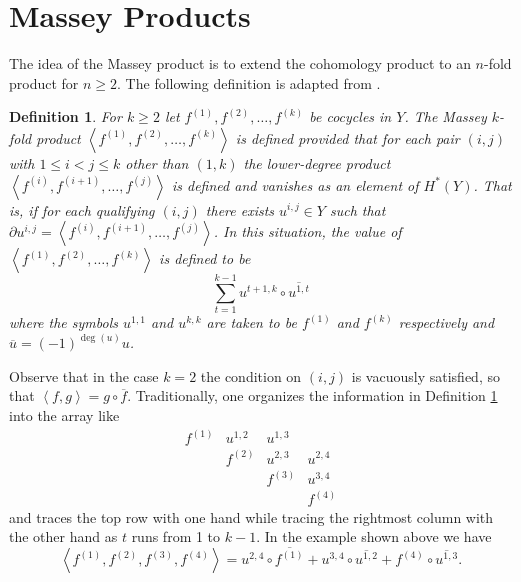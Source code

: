 \documentclass[12pt]{article}
\newtheorem{definition}{Definition}
\begin{document}
\section{Massey Products}\label{mp}
The idea of the Massey product is to extend the cohomology
product to an $n$-fold product for $n\ge 2$.
The following definition is adapted from \cite{kraines}.

\begin{definition}\label{massey}
For $k\ge 2$ let 
$f^{\left(1\right)},
f^{\left(2\right)},\dots,f^{\left(k\right)}$ be cocycles in $Y$.
The {\em Massey $k$-fold product} 
$\left\langle f^{\left(1\right)},
f^{\left(2\right)},\dots,f^{\left(k\right)}\right\rangle$
is defined provided that for each pair $\left(i,j\right)$
with $1\le i<j\le k$ other than $\left(1,k\right)$
the lower-degree product 
$\left\langle f^{\left(i\right)},
f^{\left(i+1\right)},\dots,f^{\left(j\right)}\right\rangle$
is defined and vanishes as an element of $H^\ast\left(Y\right)$.
That is, if for each qualifying $\left(i,j\right)$
there exists $u^{i,j}\in Y$ such that 
$\partial u^{i,j}
=\left\langle f^{\left(i\right)},
f^{\left(i+1\right)},\dots,f^{\left(j\right)}\right\rangle$.
In this situation, the value of
$\left\langle f^{\left(1\right)},
f^{\left(2\right)},\dots,f^{\left(k\right)}\right\rangle$
is defined to be
\[\sum_{t=1}^{k-1}
u^{t+1,k}\circ
\overline{u^{1,t}}
\]
where the symbols $u^{1,1}$ and $u^{k,k}$ are taken
to be $f^{\left(1\right)}$ and 
$f^{\left(k\right)}$ respectively
and $\overline{u}=\left(-1\right)^{\deg\left(u\right)}u$.
\end{definition}

Observe that in the case $k=2$ the condition
on $\left(i,j\right)$ is vacuously satisfied,
so that $\left\langle f,g\right\rangle=g\circ\overline{f}$.
Traditionally, one organizes the information
in Definition \ref{massey} 
into the array like
\[\begin{array}{cccc}
f^{\left(1\right)}&u^{1,2}&u^{1,3}\\
&f^{\left(2\right)}&u^{2,3}&u^{2,4}\\
&&f^{\left(3\right)}&u^{3,4}\\
&&&f^{\left(4\right)}\end{array}\]
and traces the top row with one hand
while tracing the rightmost column with
the other hand as $t$ runs from 1 to $k-1$.
In the example shown above we have
\[\left\langle f^{\left(1\right)},f^{\left(2\right)},
f^{\left(3\right)},f^{\left(4\right)}\right\rangle
=u^{2,4}\circ \overline{f^{\left(1\right)}}
+ u^{3,4}\circ \overline{u^{1,2}} 
+ f^{\left(4\right)}\circ \overline{u^{1,3}}.\]
\end{document}
